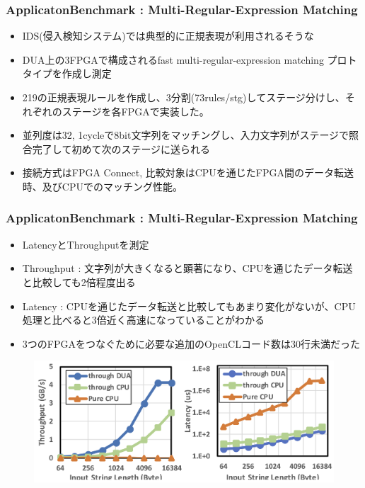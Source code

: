 \documentclass[dvipdfmx,9pt,notheorems]{beamer}
\theoremstyle{definition}
\begin{document}
\begin{frame}\frametitle{ApplicatonBenchmark : Multi-Regular-Expression Matching}
	\begin{itemize}
		\item IDS(侵入検知システム)では典型的に正規表現が利用されるそうな
    \item DUA上の3FPGAで構成されるfast multi-regular-expression matching プロトタイプを作成し測定
		\item 219の正規表現ルールを作成し、3分割(73rules/stg)してステージ分けし、それぞれのステージを各FPGAで実装した。
		\item 並列度は32, 1cycleで8bit文字列をマッチングし、入力文字列がステージで照合完了して初めて次のステージに送られる
		\item 接続方式はFPGA Connect, 比較対象はCPUを通じたFPGA間のデータ転送時、及びCPUでのマッチング性能。
	\end{itemize}
\pnote{
}
\end{frame}

\begin{frame}\frametitle{ApplicatonBenchmark : Multi-Regular-Expression Matching}
	\begin{itemize}
		\item LatencyとThroughputを測定
		\item Throughput : 文字列が大きくなると顕著になり、CPUを通じたデータ転送と比較しても2倍程度出る
		\item Latency : CPUを通じたデータ転送と比較してもあまり変化がないが、CPU処理と比べると3倍近く高速になっていることがわかる
		\item 3つのFPGAをつなぐために必要な追加のOpenCLコード数は30行未満だった
	\end{itemize}
  \begin{figure}[htb]
		\includegraphics[scale=1.0]{fig/figure13.png}
  \end{figure}
\end{frame}
\end{document}
